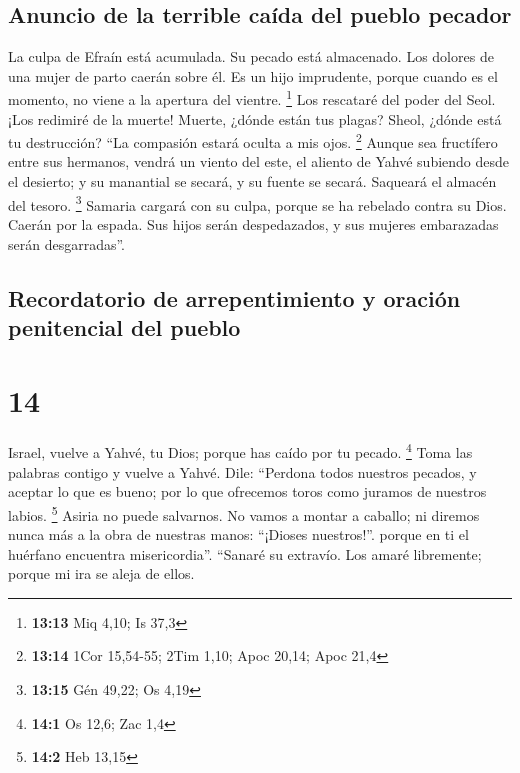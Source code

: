 \hypertarget{anuncio-de-la-terrible-cauxedda-del-pueblo-pecador}{%
\subsection{Anuncio de la terrible caída del pueblo
pecador}\label{anuncio-de-la-terrible-cauxedda-del-pueblo-pecador}}

 La culpa de Efraín está acumulada. Su pecado está
almacenado.  Los dolores de una mujer de parto caerán
sobre él. Es un hijo imprudente, porque cuando es el momento, no viene a
la apertura del vientre. \footnote{\textbf{13:13} Miq 4,10; Is 37,3}
 Los rescataré del poder del Seol. ¡Los redimiré de la
muerte! Muerte, ¿dónde están tus plagas? Sheol, ¿dónde está tu
destrucción? ``La compasión estará oculta a mis ojos. \footnote{\textbf{13:14}
  1Cor 15,54-55; 2Tim 1,10; Apoc 20,14; Apoc 21,4} 
Aunque sea fructífero entre sus hermanos, vendrá un viento del este, el
aliento de Yahvé subiendo desde el desierto; y su manantial se secará, y
su fuente se secará. Saqueará el almacén del tesoro. \footnote{\textbf{13:15}
  Gén 49,22; Os 4,19}  Samaria cargará con su culpa,
porque se ha rebelado contra su Dios. Caerán por la espada. Sus hijos
serán despedazados, y sus mujeres embarazadas serán desgarradas''.

\hypertarget{recordatorio-de-arrepentimiento-y-oraciuxf3n-penitencial-del-pueblo}{%
\subsection{Recordatorio de arrepentimiento y oración penitencial del
pueblo}\label{recordatorio-de-arrepentimiento-y-oraciuxf3n-penitencial-del-pueblo}}

\hypertarget{section-13}{%
\section{14}\label{section-13}}

 Israel, vuelve a Yahvé, tu Dios; porque has caído por tu
pecado. \footnote{\textbf{14:1} Os 12,6; Zac 1,4}  Toma
las palabras contigo y vuelve a Yahvé. Dile: ``Perdona todos nuestros
pecados, y aceptar lo que es bueno; por lo que ofrecemos toros como
juramos de nuestros labios. \footnote{\textbf{14:2} Heb 13,15}
 Asiria no puede salvarnos. No vamos a montar a caballo;
ni diremos nunca más a la obra de nuestras manos: ``¡Dioses nuestros!''.
porque en ti el huérfano encuentra misericordia''. 
``Sanaré su extravío. Los amaré libremente; porque mi ira se aleja de
ellos.

